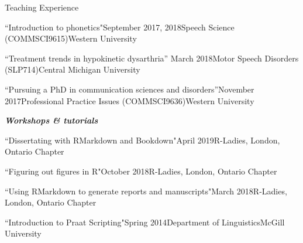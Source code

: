 \documentclass{resume} %
\begin{document}
\begin{rSection}{Teaching Experience}
	\begin{rSubsection}{``Introduction to phonetics"}{September 2017, 2018}{Speech Science (COMMSCI9615)}{Western University}
	\end{rSubsection}

	\begin{rSubsection}{``Treatment trends in hypokinetic dysarthria'' }{March 2018}{Motor Speech Disorders (SLP714)}{Central Michigan University}
	\end{rSubsection}
	
	\begin{rSubsection}{``Pursuing a PhD in communication sciences and disorders''}{November 2017}{Professional Practice Issues (COMMSCI9636)}{Western University}
	\end{rSubsection}

\begin{center}
	{\bf \emph{Workshops \& tutorials}}
\end{center}

	\begin{rSubsection}{``Dissertating with RMarkdown and Bookdown"}{April 2019}{R-Ladies, London, Ontario Chapter}{}
	\end{rSubsection}
	
	\begin{rSubsection}{``Figuring out figures in R"}{October 2018}{R-Ladies, London, Ontario Chapter}{}
	\end{rSubsection}
	
	
	\begin{rSubsection}{``Using RMarkdown to generate reports and manuscripts"}{March 2018}{R-Ladies, London, Ontario Chapter}{}
	\end{rSubsection}
	
	
	\begin{rSubsection}{``Introduction to Praat Scripting"}{Spring 2014}{Department of Linguistics}{McGill University}
	\end{rSubsection}

\end{rSection}
\end{document}
